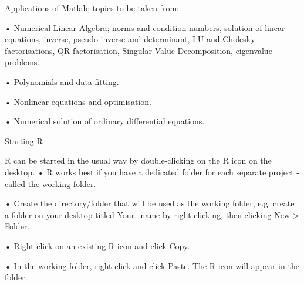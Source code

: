 Applications of Matlab; topics to be taken from:

•
Numerical Linear Algebra; norms and condition numbers, solution of linear equations, inverse, pseudo-inverse and determinant, LU and Cholesky factorisations, QR factorisation, Singular Value Decomposition, eigenvalue problems.

•
Polynomials and data fitting.

•
Nonlinear equations and optimisation.

•
Numerical solution of ordinary differential equations.










 Starting R


R can be started in the usual way by double-clicking on the R icon on the desktop.
•
R works best if you have a dedicated folder for each separate project - called the working folder.

•
Create the directory/folder that will be used as the working folder, e.g. create a folder on your desktop titled Your_name by right-clicking, then clicking New > Folder.

•
Right-click on an existing R icon and click Copy.

•
In the working folder, right-click and click Paste. The R icon will appear in the folder.



